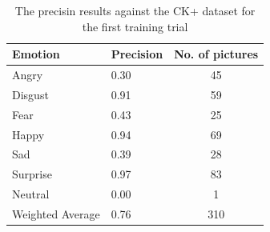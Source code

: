 \documentclass[runningheads,a4paper,11pt]{report}
\begin{document}
\begin{table}[htbp]
	\caption{The precisin results against the CK+ dataset for the first training trial}
	\label{fer_training_35k_ckp}
		\begin{center}
			\begin{tabular}{p{110pt}p{110pt}c}
				\textbf{Emotion}& \textbf{Precision}& \textbf{No. of pictures} \\
				\hline\hline
				Angry& 0.30& 45 \\
				Disgust& 0.91& 59 \\
				Fear& 0.43& 25 \\
				Happy& 0.94& 69 \\
				Sad& 0.39& 28 \\
				Surprise& 0.97& 83 \\
				Neutral& 0.00& 1 \\
				\hline
				Weighted Average& 0.76& 310
			\end{tabular}
		\end{center}
\end{table}
\end{document}

